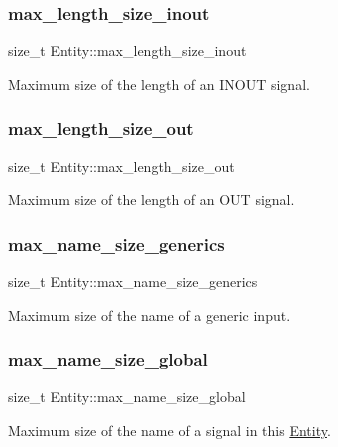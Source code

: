 \subsubsection{\texorpdfstring{max\_length\_size\_inout}{max\_length\_size\_inout}}
{\footnotesize\ttfamily size\+\_\+t Entity\+::max\+\_\+length\+\_\+size\+\_\+inout}

Maximum size of the length of an I\+N\+O\+UT signal. \mbox{\label{struct_entity_aaac43fe338ec2162eb69ee47920f3363}} 
\subsubsection{\texorpdfstring{max\_length\_size\_out}{max\_length\_size\_out}}
{\footnotesize\ttfamily size\+\_\+t Entity\+::max\+\_\+length\+\_\+size\+\_\+out}

Maximum size of the length of an O\+UT signal. \mbox{\label{struct_entity_a8b0c53c2f6867fd1c011210e63efcaad}} 
\subsubsection{\texorpdfstring{max\_name\_size\_generics}{max\_name\_size\_generics}}
{\footnotesize\ttfamily size\+\_\+t Entity\+::max\+\_\+name\+\_\+size\+\_\+generics}

Maximum size of the name of a generic input. \mbox{\label{struct_entity_a5066a9a519892bae3522583614ad4265}} 
\subsubsection{\texorpdfstring{max\_name\_size\_global}{max\_name\_size\_global}}
{\footnotesize\ttfamily size\+\_\+t Entity\+::max\+\_\+name\+\_\+size\+\_\+global}

Maximum size of the name of a signal in this \mbox{\hyperlink{struct_entity}{Entity}}. \mbox{\label{struct_entity_ae224ddbebe0375e2b802c08ca7f15dda}} 
